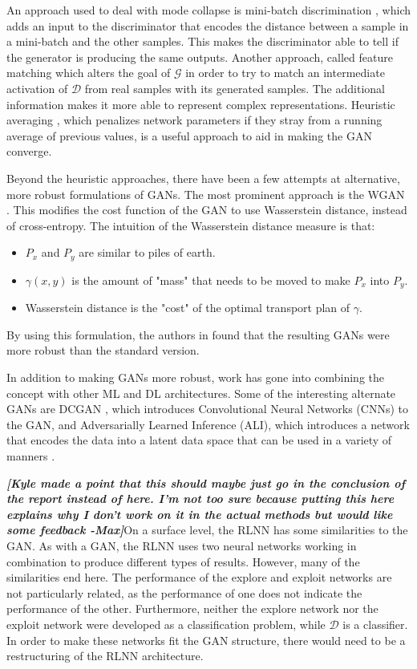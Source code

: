 	\par An approach used to deal with mode collapse is mini-batch discrimination \cite{ioffe2015batch}, which adds an input to the discriminator that encodes the distance between a sample in a mini-batch and the other samples. This makes the discriminator able to tell if the generator is producing the same outputs. Another approach, called feature matching \cite{salimans2016improved} which alters the goal of $\mathcal{G}$ in order to try to match an intermediate activation of $\mathcal{D}$ from real samples with its generated samples. The additional information makes it more able to represent complex representations. Heuristic averaging \cite{salimans2016improved}, which penalizes network parameters if they stray from a running average of previous values, is a useful approach to aid in making the GAN converge. 
	\par Beyond the heuristic approaches, there have been a few attempts at alternative, more robust formulations of GANs. The most prominent approach is the WGAN \cite{wganPaper}. This modifies the cost function of the GAN to use Wasserstein distance, instead of cross-entropy. The intuition of the Wasserstein distance measure is that:  
	\begin{itemize}
		\item $P_x$ and $P_y$ are similar to piles of earth. 
		\item $\gamma(x,y)$ is the amount of "mass" that needs to be moved to make $P_x$ into $P_y$.
		\item Wasserstein distance is the "cost" of the optimal transport plan of $\gamma$.
	\end{itemize}
	\par By using this formulation, the authors in \cite{wganPaper} found that the resulting GANs were more robust than the standard version. 
	\par In addition to making GANs more robust, work has gone into combining the concept with other ML and DL architectures. Some of the interesting alternate GANs are DCGAN \cite{radford2015unsupervised}, which introduces Convolutional Neural Networks (CNNs) to the GAN, and Adversarially Learned Inference (ALI), which introduces a network that encodes the data into a latent data space that can be used in a variety of manners \cite{ALI_encdec_inference}. 
	\par \textbf{\textit{[Kyle made a point that this should maybe just go in the conclusion of the report instead of here. I'm not too sure because putting this here explains why I don't work on it in the actual methods but would like some feedback -Max]}}On a surface level, the RLNN has some similarities to the GAN. As with a GAN, the RLNN uses two neural networks working in combination to produce different types of results. However, many of the similarities end here. The performance of the explore and exploit networks are not particularly related, as the performance of one does not indicate the performance of the other. Furthermore, neither the explore network nor the exploit network were developed as a classification problem, while $\mathcal{D}$ is a classifier. In order to make these networks fit the GAN structure, there would need to be a restructuring of the RLNN architecture.
